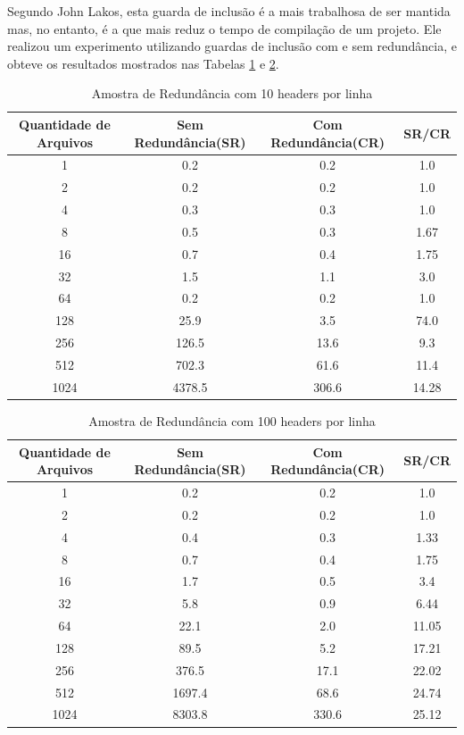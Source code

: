 \begin{enumerate}
Segundo John Lakos\cite[pág. 82]{ref42}, esta guarda de inclusão é a mais trabalhosa de ser mantida
 mas, no entanto, é a que mais reduz o tempo de compilação de um projeto. Ele
 realizou um experimento utilizando guardas de inclusão com e sem redundância,
 e obteve os resultados mostrados nas Tabelas \ref{tab:tabela_01} e 
\ref{tab:tabela_02}.

\begin{table}[!ht]
    \centering
    \caption {Amostra de Redundância com 10 headers por linha}
    \label{tab:tabela_01}
    \begin{tiny}
    \begin{tabular}{cccc}
    \toprule
    \textbf{Quantidade de Arquivos} & \textbf{Sem Redundância(SR)} & \textbf{Com Redundância(CR)} &  \textbf{SR/CR} \\
    \midrule
    1 & 0.2 & 0.2 & 1.0\\
    2 & 0.2 & 0.2 & 1.0\\
    4 & 0.3 & 0.3 & 1.0\\
    8 & 0.5 & 0.3 & 1.67\\
    16 & 0.7 & 0.4 & 1.75\\
    32 & 1.5 & 1.1 & 3.0\\
    64 & 0.2 & 0.2 & 1.0\\
    128 & 25.9 & 3.5 & 74.0\\
    256 & 126.5 & 13.6 & 9.3\\
    512 & 702.3 & 61.6 & 11.4\\
    1024 & 4378.5 & 306.6 & 14.28\\
    \bottomrule
    \end{tabular}
    \end{tiny}
\end{table}

\begin{table}[!ht]
    \centering
    \caption {Amostra de Redundância com 100 headers por linha }
    \label{tab:tabela_02}
    \begin{tiny}
    \begin{tabular}{cccc}
    \toprule
    \textbf{Quantidade de Arquivos} & \textbf{Sem Redundância(SR)} & \textbf{Com Redundância(CR)} &  \textbf{SR/CR} \\
    \midrule
    1 & 0.2 & 0.2 & 1.0\\
    2 & 0.2 & 0.2 & 1.0\\
    4 & 0.4 & 0.3 & 1.33\\
    8 & 0.7 & 0.4 & 1.75\\
    16 & 1.7 & 0.5 & 3.4\\
    32 & 5.8 & 0.9 & 6.44\\
    64 & 22.1 & 2.0 & 11.05\\
    128 & 89.5 & 5.2 & 17.21\\
    256 & 376.5 & 17.1 & 22.02\\
    512 & 1697.4 & 68.6 & 24.74\\
    1024 & 8303.8 & 330.6 & 25.12\\
    \bottomrule
    \end{tabular}
    \end{tiny}
\end{table}


\end{enumerate}
